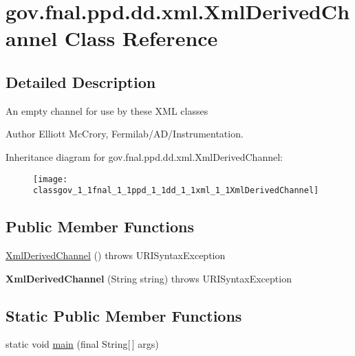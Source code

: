 \hypertarget{classgov_1_1fnal_1_1ppd_1_1dd_1_1xml_1_1XmlDerivedChannel}{\section{gov.\-fnal.\-ppd.\-dd.\-xml.\-Xml\-Derived\-Channel Class Reference}
\label{classgov_1_1fnal_1_1ppd_1_1dd_1_1xml_1_1XmlDerivedChannel}
}


\subsection{Detailed Description}
An empty channel for use by these X\-M\-L classes

\begin{DoxyAuthor}{Author}
Elliott Mc\-Crory, Fermilab/\-A\-D/\-Instrumentation. 
\end{DoxyAuthor}
Inheritance diagram for gov.\-fnal.\-ppd.\-dd.\-xml.\-Xml\-Derived\-Channel\-:\begin{figure}[H]
\begin{center}
\leavevmode
\texttt{[image: classgov\_1\_1fnal\_1\_1ppd\_1\_1dd\_1\_1xml\_1\_1XmlDerivedChannel]}
\end{center}
\end{figure}
\subsection*{Public Member Functions}
\begin{DoxyCompactItemize}
\item 
\hyperlink{classgov_1_1fnal_1_1ppd_1_1dd_1_1xml_1_1XmlDerivedChannel_a99604d4e33cb14128bdadbbeb26e961a}{Xml\-Derived\-Channel} ()  throws U\-R\-I\-Syntax\-Exception 
\item 
\hypertarget{classgov_1_1fnal_1_1ppd_1_1dd_1_1xml_1_1XmlDerivedChannel_a42743783587a2fcfe7ed1eebe5d04299}{{\bfseries Xml\-Derived\-Channel} (String string)  throws U\-R\-I\-Syntax\-Exception }\label{classgov_1_1fnal_1_1ppd_1_1dd_1_1xml_1_1XmlDerivedChannel_a42743783587a2fcfe7ed1eebe5d04299}

\end{DoxyCompactItemize}
\subsection*{Static Public Member Functions}
\begin{DoxyCompactItemize}
\item 
static void \hyperlink{classgov_1_1fnal_1_1ppd_1_1dd_1_1xml_1_1XmlDerivedChannel_a2c89f72f377c9a9c03cf16bef99efa8e}{main} (final String\mbox{[}$\,$\mbox{]} args)
\end{DoxyCompactItemize}
